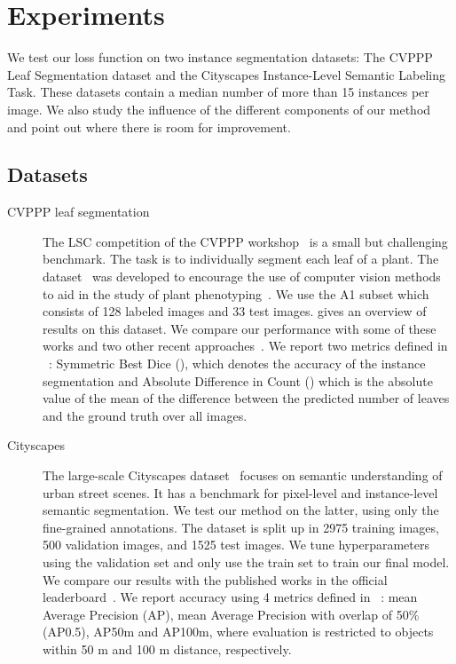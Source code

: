 \documentclass[10pt,twocolumn,letterpaper]{article}
\begin{document}
\section{Experiments}
\label{sec:experiments}
We test our loss function on two instance segmentation datasets: The CVPPP Leaf Segmentation dataset and the Cityscapes Instance-Level Semantic Labeling Task. These datasets contain a median number of more than 15 instances per image. We also study the influence of the different components of our method and point out where there is room for improvement. 

\subsection{Datasets}
\begin{description}
	\item[CVPPP leaf segmentation]
    The LSC competition of the CVPPP workshop~\cite{CVPPP} is a small but challenging benchmark.
    The task is to individually segment each leaf of a plant. The dataset~\cite{minervini2015finely} was developed to encourage the use of computer vision methods to aid in the study of plant phenotyping~\cite{minervini2015image}. We use the A1 subset which consists of 128 labeled images and 33 test images. \cite{scharr2016leaf} gives an overview of results on this dataset. We compare our performance with some of these works and two other recent approaches~\cite{romera2015recurrent, ren2016end}.
	We report two metrics defined in  ~\cite{scharr2016leaf}: Symmetric Best Dice (), which denotes the accuracy of the instance segmentation and Absolute Difference in Count () which is the absolute value of the mean of the difference between the predicted number of leaves and the ground truth over all images.
		
	\item[Cityscapes] The large-scale Cityscapes dataset~\cite{cordts2016cityscapes} focuses on semantic understanding of urban street scenes. It has a benchmark for pixel-level and instance-level semantic segmentation. We test our method on the latter, using only the fine-grained annotations. The dataset is split up in 2975 training images, 500 validation images, and 1525 test images. We tune hyperparameters using the validation set and only use the train set to train our final model. We compare our results with the published works in the official leaderboard~\cite{cityscapes}.
    We report accuracy using 4 metrics defined in ~\cite{cordts2016cityscapes}: mean Average Precision (AP), mean Average Precision with overlap of 50\% (AP0.5), AP50m and AP100m, where  evaluation is restricted to objects within 50 m and 100 m distance, respectively.

\end{description}
\end{document}
